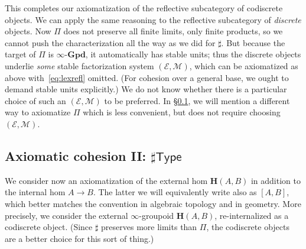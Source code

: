\documentclass[copyright,12pt]{eptcs}
\newcommand{\type}{\ensuremath{\mathsf{Type}}\xspace}
\newcommand{\ig}{\ensuremath{\infty\text{-}\mathbf{Gpd}}\xspace}
\renewcommand{\H}{\ensuremath{\mathbf{H}}\xspace}
\newcommand{\io}{\ensuremath{(\infty,1)}}
\newcommand{\E}{\ensuremath{\mathcal{E}}\xspace}
\newcommand{\M}{\ensuremath{\mathcal{M}}\xspace}
\begin{document}
This completes our axiomatization of the reflective subcategory of codiscrete objects.
%
We can apply the same reasoning to the reflective subcategory of \emph{discrete} objects.
Now $\Pi$ does not preserve all finite limits, only finite products, so we cannot push the characterization all the way as we did for $\sharp$.
But because the target of $\Pi$ is \ig, it automatically has stable units; thus the discrete objects underlie \emph{some} stable factorization system $(\E,\M)$, which can be axiomatized as above with~\eqref{eq:lexrefl} omitted.
(For cohesion over a general base, we ought to demand stable units explicitly.)
%
We do not know whether there is a particular choice of such an $(\E,\M)$ to be preferred.
In \S\ref{sec:axiomatic-cohesion-ii}, we will mention a different way to axiomatize $\Pi$ which is less convenient, but does not require choosing $(\E,\M)$.


\subsection{Axiomatic cohesion II: $\sharp\type$}
\label{sec:axiomatic-cohesion-ii}

We consider now an axiomatization of the external hom $\H(A,B)$ in addition
to the internal hom $A \to B$. The latter we will equivalently write also as
$[A,B]$, which better matches the convention in algebraic topology and in geometry.
More precisely, we consider the external $\infty$-groupoid $\H(A,B)$, re-internalized as a codiscrete object.
(Since $\sharp$ preserves more limits than $\Pi$, the codiscrete objects are a better choice for this sort of thing.)
\end{document}
